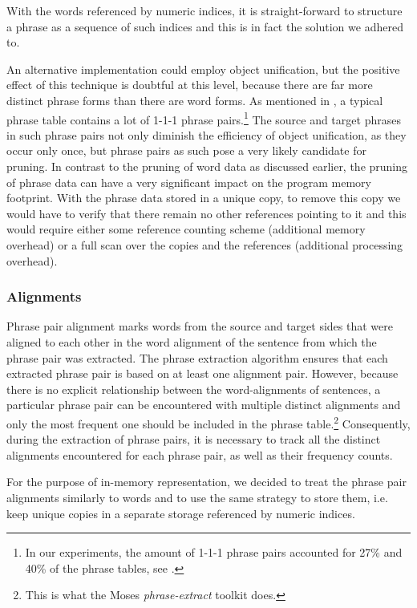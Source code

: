With the words referenced by numeric indices, it is straight-forward to structure a phrase
as a sequence of such indices and this is in fact the solution we adhered to.

An alternative implementation could employ object unification, but the positive effect
of this technique is doubtful at this level, because there are far more distinct phrase
forms than there are word forms.
As mentioned in , a typical phrase table contains a lot
of 1-1-1 phrase pairs.\footnote{In our experiments, the amount of 1-1-1 phrase pairs
accounted for 27\% and 40\% of the phrase tables, see .}
The source and target phrases in such phrase pairs not only diminish the
efficiency of object unification, as they occur only once, but phrase pairs as such
pose a very likely candidate for pruning.
In contrast to the pruning of word data as discussed earlier, the pruning of phrase
data can have a very significant impact on the program memory footprint.
With the phrase data stored in a unique copy, to remove this copy we would have to
verify that there remain no other references pointing to it and this would require
either some reference counting scheme (additional memory overhead) or a full scan over
the copies and the references (additional processing overhead).

\subsubsection*{Alignments}

Phrase pair alignment marks words from the source and target sides that were aligned to
each other in the word alignment of the sentence from which the phrase pair was extracted.
The phrase extraction algorithm ensures that each extracted phrase pair is based on
at least one alignment pair.
However, because there is no explicit relationship between the word-alignments of sentences,
a particular phrase pair can be encountered with multiple distinct alignments and only
the most frequent one should be included in the phrase table.\footnote{This is what the Moses \emph{phrase-extract} toolkit does.}
Consequently, during the extraction of phrase pairs, it is necessary to track all the
distinct alignments encountered for each phrase pair, as well as their frequency counts.

For the purpose of in-memory representation, we decided to treat the phrase pair alignments
similarly to words and to use the same strategy to store them, i.e. keep unique copies in
a separate storage referenced by numeric indices.

